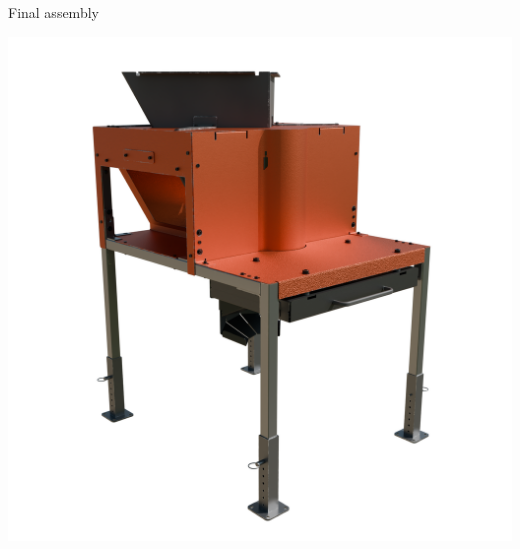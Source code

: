 \documentclass[a5paper,portrait]{article}
\begin{document}
\centering
\vspace*{2cm}
        {\color{mainblue}\sffamily\Huge Final assembly}\\[1cm]
\begin{center}
            \includegraphics[width=1\textwidth]{../images/Chap4_Assembly.png}
\end{center}
\newpage

\newpage

\newpage

\newpage

\newpage
\end{document}

